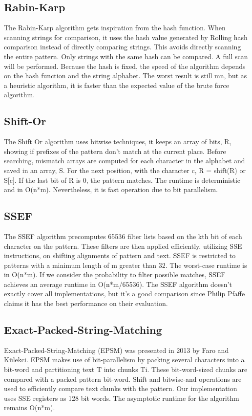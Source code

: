 \documentclass[11pt]{article}       %
\begin{document}
\subsection{Rabin-Karp}\label{rk}
The Rabin-Karp algorithm gets inspiration from the hash function. When scanning strings for comparison, it uses the hash value generated by Rolling hash comparison instead of directly comparing strings. This avoids directly scanning the entire pattern. Only strings with the same hash can be compared. A full scan will be performed. Because the hash is fixed, the speed of the algorithm depends on the hash function and the string alphabet. The worst result is still mn, but as a heuristic algorithm, it is faster than the expected value of the brute force algorithm.

\subsection{Shift-Or}\label{so}
The Shift Or algorithm uses bitwise techniques\cite{Matching}, it keeps an array of bits, R, showing if prefixes of the pattern don't match at the current place. Before searching, mismatch arrays are computed for each character in the alphabet and saved in an array, S. For the next position, with the character c, R = shift(R) or S[c]. If the last bit of R is 0, the pattern matches. The runtime is deterministic and in O(n*m). Nevertheless, it is fast operation due to bit parallelism.

\subsection{SSEF}\label{SSEF}
The SSEF algorithm precomputes 65536 filter lists based on the kth bit of each character on the pattern. These filters are then applied efficiently, utilizing SSE instructions, on shifting alignments of pattern and text. SSEF is restricted to patterns with a minimum length of m greater than 32. The worst-case runtime is in O(n*m). If we consider the probability to filter possible matches, SSEF achieves an average runtime in O(n*m/65536). The SSEF algorithm doesn't exactly cover all implementations, but it's a good comparison since Philip Pfaffe claims it has the best performance on their evaluation.

\subsection{Exact-Packed-String-Matching}\label{EPSM}
Exact-Packed-String-Matching (EPSM) was presented in 2013 by Faro and Külekci. EPSM makes use of bit-parallelism by packing several characters into a bit-word and partitioning text T into chunks Ti. These bit-word-sized chunks are compared with a packed pattern bit-word. Shift and bitwise-and operations are used to efficiently compare text chunks with the pattern. Our implementation uses SSE registers as 128 bit words. The asymptotic runtime for the algorithm remains O(n*m).
\end{document}
